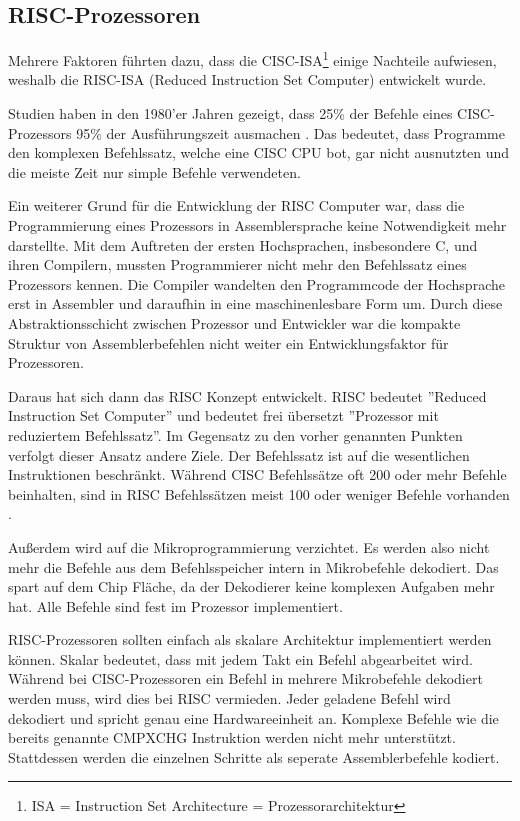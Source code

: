 \documentclass[12pt]{article}
\begin{document}
\subsection{RISC-Prozessoren}
Mehrere Faktoren führten dazu, dass die CISC-ISA\footnote{ISA = Instruction Set Architecture = Prozessorarchitektur} einige Nachteile aufwiesen, weshalb die RISC-ISA (Reduced Instruction Set Computer) entwickelt wurde.

\par \bigskip
\noindent Studien haben in den 1980'er Jahren gezeigt, dass 25\% der Befehle eines CISC-Prozessors 95\% der Ausführungszeit ausmachen \cite{jamil1995risc}. Das bedeutet, dass Programme den komplexen Befehlssatz, welche eine CISC CPU bot, gar nicht ausnutzten und die meiste Zeit nur simple Befehle verwendeten. \cite{patterson1985reduced} 

\par \bigskip
\noindent Ein weiterer Grund für die Entwicklung der RISC Computer war, dass die Programmierung eines Prozessors in Assemblersprache keine Notwendigkeit mehr darstellte. Mit dem Auftreten der ersten Hochsprachen, insbesondere C, und ihren Compilern, mussten Programmierer nicht mehr den Befehlssatz eines Prozessors kennen. Die Compiler wandelten den Programmcode der Hochsprache erst in Assembler und daraufhin in eine maschinenlesbare Form um. Durch diese Abstraktionsschicht zwischen Prozessor und Entwickler war die kompakte Struktur von Assemblerbefehlen nicht weiter ein Entwicklungsfaktor für Prozessoren.

\par \bigskip
\noindent Daraus hat sich dann das RISC Konzept entwickelt. RISC bedeutet ''Reduced Instruction Set Computer'' und bedeutet frei übersetzt ''Prozessor mit reduziertem Befehlssatz''. Im Gegensatz zu den vorher genannten Punkten verfolgt dieser Ansatz andere Ziele. Der Befehlssatz ist auf die wesentlichen Instruktionen beschränkt. Während CISC Befehlssätze oft 200 oder mehr Befehle beinhalten, sind in RISC Befehlssätzen meist 100 oder weniger Befehle vorhanden \cite[S. 85]{TaschenbuchMikroprozessortechnik}.
\par \bigskip
\noindent Außerdem wird auf die Mikroprogrammierung verzichtet. Es werden also nicht mehr die Befehle aus dem Befehlsspeicher intern in Mikrobefehle dekodiert. Das spart auf dem Chip Fläche, da der Dekodierer keine komplexen Aufgaben mehr hat. Alle Befehle sind fest im Prozessor implementiert.
\par \bigskip
\noindent RISC-Prozessoren sollten einfach als skalare Architektur implementiert werden können. Skalar bedeutet, dass mit jedem Takt ein Befehl abgearbeitet wird. Während bei CISC-Prozessoren ein Befehl in mehrere Mikrobefehle dekodiert werden muss, wird dies bei RISC vermieden. Jeder geladene Befehl wird dekodiert und spricht genau eine Hardwareeinheit an. Komplexe Befehle wie die bereits genannte CMPXCHG Instruktion werden nicht mehr unterstützt. Stattdessen werden die einzelnen Schritte als seperate Assemblerbefehle kodiert. 
\end{document}
